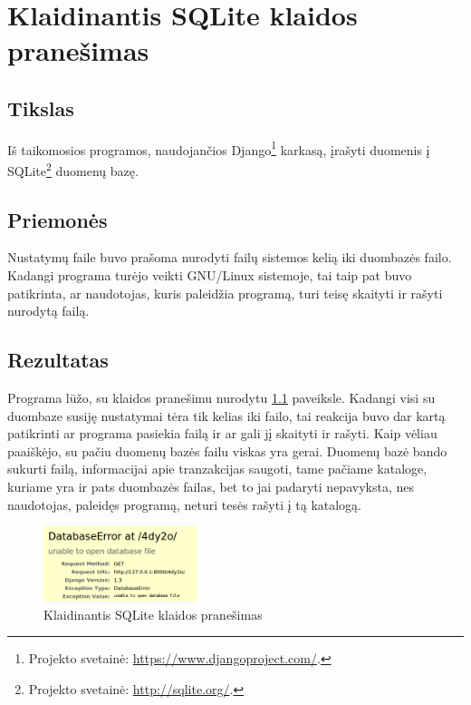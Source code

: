 \chapter{Klaidinantis SQLite klaidos pranešimas}

\section{Tikslas}

Iš taikomosios programos, naudojančios 
Django\footnote{Projekto svetainė: \url{https://www.djangoproject.com/}.} 
karkasą, įrašyti duomenis į
SQLite\footnote{Projekto svetainė: \url{http://sqlite.org/}.}
duomenų bazę.

\section{Priemonės}

Nustatymų faile buvo prašoma nurodyti failų sistemos kelią iki duombazės 
failo. Kadangi programa turėjo veikti GNU/Linux sistemoje, tai taip
pat buvo patikrinta, ar naudotojas, kuris paleidžia programą, turi
teisę skaityti ir rašyti nurodytą failą.

\section{Rezultatas}

Programa lūžo, su klaidos pranešimu nurodytu
\ref{fig:case_1_sqlite_error} paveiksle. Kadangi visi su duombaze susiję
nustatymai tėra tik kelias iki failo, tai reakcija buvo dar kartą
patikrinti ar programa pasiekia failą ir ar gali jį skaityti ir rašyti.
Kaip vėliau paaiškėjo, su pačiu duomenų bazės failu viskas yra gerai.
Duomenų bazė bando sukurti failą, informacijai apie tranzakcijas
saugoti, tame pačiame kataloge, kuriame yra ir pats duombazės failas,
bet to jai padaryti nepavyksta, nes naudotojas, paleidęs programą,
neturi tesės rašyti į tą katalogą.

\begin{figure}[H]
  \begin{center}
    \includegraphics[width=0.4\textwidth]{images/case_1_sqlite_error.png}
  \end{center}
  \caption{Klaidinantis SQLite klaidos pranešimas}
  \label{fig:case_1_sqlite_error}
\end{figure}

